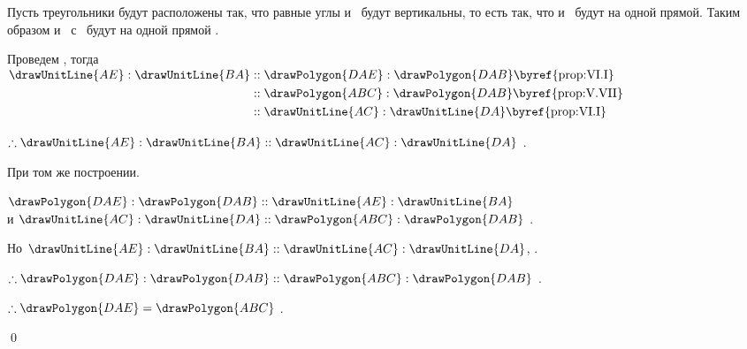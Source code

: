 \documentclass[letters,booklanguage=russian]{byrnebook}
\begin{document}
Пусть треугольники будут расположены так, что равные углы  и~ будут вертикальны, то есть так, что  и~ будут на одной прямой. Таким образом и~ с~ будут на одной прямой .

\begin{center}
Проведем , тогда\\
$\begin{aligned}
	\drawUnitLine{AE} : \drawUnitLine{BA}
	&:: \drawPolygon{DAE} : \drawPolygon{DAB} \mbox{\byref{prop:VI.I}}\\
	&:: \drawPolygon{ABC} : \drawPolygon{DAB} \mbox{\byref{prop:V.VII}}\\
	&:: \drawUnitLine{AC} : \drawUnitLine{DA} \mbox{\byref{prop:VI.I}}\\
\end{aligned}$

$\therefore \drawUnitLine{AE} : \drawUnitLine{BA} :: \drawUnitLine{AC} : \drawUnitLine{DA}$ .
\end{center}

\vfill\pagebreak

\begin{center}
При том же построении.

$\drawPolygon{DAE} : \drawPolygon{DAB} :: \drawUnitLine{AE} : \drawUnitLine{BA}$ \\
и $\drawUnitLine{AC} : \drawUnitLine{DA} :: \drawPolygon{ABC} : \drawPolygon{DAB}$ .

Но $ \drawUnitLine{AE} : \drawUnitLine{BA} :: \drawUnitLine{AC} : \drawUnitLine{DA}$, \byref{\hypref}.

$\therefore \drawPolygon{DAE} : \drawPolygon{DAB} :: \drawPolygon{ABC} : \drawPolygon{DAB}$ .

$\therefore \drawPolygon{DAE} = \drawPolygon{ABC}$ .
\end{center}

\qed
\end{document}
